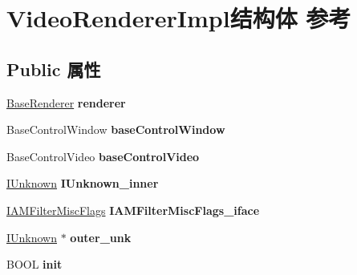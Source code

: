 \hypertarget{struct_video_renderer_impl}{}\section{Video\+Renderer\+Impl结构体 参考}
\label{struct_video_renderer_impl}
\subsection*{Public 属性}
\begin{DoxyCompactItemize}
\item 
\mbox{\label{struct_video_renderer_impl_af1762a8d8fa76aa06142aa7a08a16bec}} 
\hyperlink{struct_base_renderer_tag}{Base\+Renderer} {\bfseries renderer}
\item 
\mbox{\label{struct_video_renderer_impl_a7b97d3d077970faf455c40dd3acfabf3}} 
Base\+Control\+Window {\bfseries base\+Control\+Window}
\item 
\mbox{\label{struct_video_renderer_impl_a74ccc90a28e7f872fbaa1ea0ede256a2}} 
Base\+Control\+Video {\bfseries base\+Control\+Video}
\item 
\mbox{\label{struct_video_renderer_impl_a1b88d1f7221c1f9c6f56ff9c27d2c747}} 
\hyperlink{interface_i_unknown}{I\+Unknown} {\bfseries I\+Unknown\+\_\+inner}
\item 
\mbox{\label{struct_video_renderer_impl_ae82110a336aa348d5da155d3724dc78b}} 
\hyperlink{interface_i_a_m_filter_misc_flags}{I\+A\+M\+Filter\+Misc\+Flags} {\bfseries I\+A\+M\+Filter\+Misc\+Flags\+\_\+iface}
\item 
\mbox{\label{struct_video_renderer_impl_a1f15ee54be6822129c2d95eb7aef0135}} 
\hyperlink{interface_i_unknown}{I\+Unknown} $\ast$ {\bfseries outer\+\_\+unk}
\item 
\mbox{\label{struct_video_renderer_impl_ab9092864ca3a7d68ab529e035918a662}} 
B\+O\+OL {\bfseries init}
\item 
\mbox{\label{struct_video_renderer_impl_ab94f743cfbaea1843eee08b2f6f163ed}} 

\end{DoxyCompactItemize}

